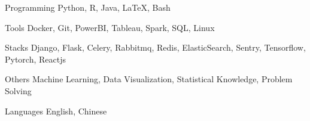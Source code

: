 

\begin{cvskills}

  \cvskill
    {Programming} %
    {Python, R, Java, LaTeX, Bash} %

  \cvskill
    {Tools} %
    {Docker, Git, PowerBI, Tableau, Spark, SQL, Linux} %

  \cvskill
    {Stacks} %
    {Django, Flask, Celery, Rabbitmq, Redis, ElasticSearch, Sentry, Tensorflow, Pytorch, Reactjs} %

  \cvskill
    {Others} %
    {Machine Learning, Data Visualization, Statistical Knowledge, Problem Solving} %
    
  \cvskill
    {Languages} %
    {English, Chinese} %

\end{cvskills}